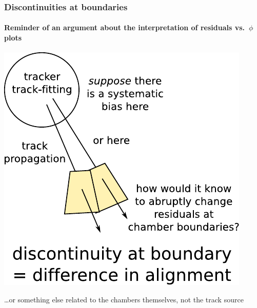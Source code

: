 \documentclass[compress]{beamer}
\begin{document}
\begin{frame}
\frametitle{Discontinuities at boundaries}
\framesubtitle{Reminder of an argument about the interpretation of
  residuals vs.~$\phi$ plots}

\begin{center}
\includegraphics[width=0.55\linewidth]{argument.pdf}
\end{center}

\large \ldots or something else related to the chambers themselves, not the track source
\end{frame}
\end{document}
